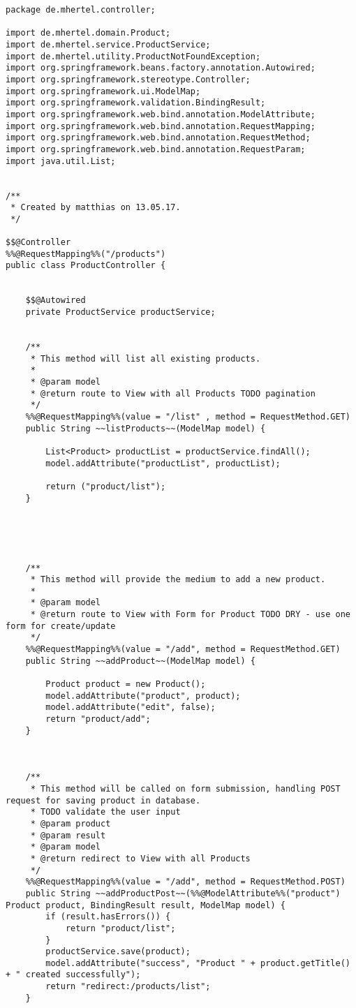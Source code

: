 \documentclass[12pt]{article}
\begin{document}
\begin{lstlisting}
package de.mhertel.controller;

import de.mhertel.domain.Product;
import de.mhertel.service.ProductService;
import de.mhertel.utility.ProductNotFoundException;
import org.springframework.beans.factory.annotation.Autowired;
import org.springframework.stereotype.Controller;
import org.springframework.ui.ModelMap;
import org.springframework.validation.BindingResult;
import org.springframework.web.bind.annotation.ModelAttribute;
import org.springframework.web.bind.annotation.RequestMapping;
import org.springframework.web.bind.annotation.RequestMethod;
import org.springframework.web.bind.annotation.RequestParam;
import java.util.List;


/**
 * Created by matthias on 13.05.17.
 */

$$@Controller
%%@RequestMapping%%("/products")
public class ProductController {


    $$@Autowired
    private ProductService productService;


    /**
     * This method will list all existing products.
     *
     * @param model
     * @return route to View with all Products TODO pagination
     */
    %%@RequestMapping%%(value = "/list" , method = RequestMethod.GET)
    public String ~~listProducts~~(ModelMap model) {

        List<Product> productList = productService.findAll();
        model.addAttribute("productList", productList);

        return ("product/list");
    }





    /**
     * This method will provide the medium to add a new product.
     *
     * @param model
     * @return route to View with Form for Product TODO DRY - use one form for create/update
     */
    %%@RequestMapping%%(value = "/add", method = RequestMethod.GET)
    public String ~~addProduct~~(ModelMap model) {

        Product product = new Product();
        model.addAttribute("product", product);
        model.addAttribute("edit", false);
        return "product/add";
    }



    /**
     * This method will be called on form submission, handling POST request for saving product in database.
     * TODO validate the user input
     * @param product
     * @param result
     * @param model
     * @return redirect to View with all Products
     */
    %%@RequestMapping%%(value = "/add", method = RequestMethod.POST)
    public String ~~addProductPost~~(%%@ModelAttribute%%("product") Product product, BindingResult result, ModelMap model) {
        if (result.hasErrors()) {
            return "product/list";
        }
        productService.save(product);
        model.addAttribute("success", "Product " + product.getTitle() + " created successfully");
        return "redirect:/products/list";
    }









\end{lstlisting}
\end{document}
